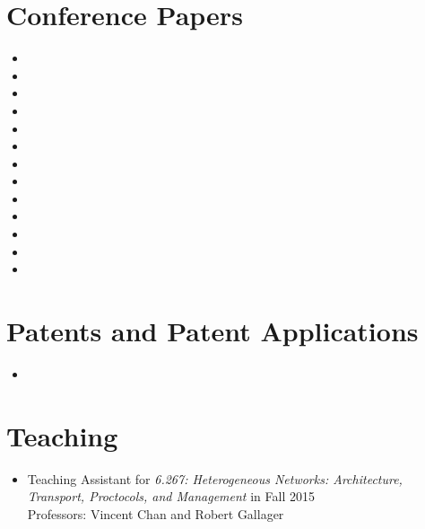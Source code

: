 \documentclass[letterpaper,12pt]{article}
\begin{document}
\section{Conference Papers}

\begin{itemize}
\item {}
\item {}
\item {}
\item {}
\item {}
\item {}
\item {}
\item {}
\item {}
\item {}
\item {}
\item {}
\item {}
\end{itemize}

\section{Patents and Patent Applications}

\begin{itemize}
\item {}
\end{itemize}

\section{Teaching}

\begin{itemize}

\item Teaching Assistant for \emph{6.267: Heterogeneous Networks: Architecture, Transport, Proctocols, and Management} in Fall 2015\\
Professors: Vincent Chan and Robert Gallager

\end{itemize}

% 
% 
\end{document}
